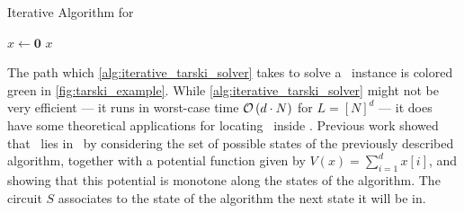 \begin{algorithm}
	\caption{Iterative Algorithm for \Tarski}
	\label{alg:iterative_tarski_solver}
	$x \leftarrow \mathbf{0}$ \;
	\Return $x$ \;
\end{algorithm}

The path which \cref{alg:iterative_tarski_solver} takes to solve a \Tarski\ instance is colored green in \cref{fig:tarski_example}. While \cref{alg:iterative_tarski_solver} might not be very efficient --- it runs in worst-case time $\mathcal{O}\left(d \cdot N\right)$ for $L = [N]^d$ --- it does have some theoretical applications for locating \Tarski\ inside \TFNP. Previous work  showed that \Tarski\ lies in \PLS\ by considering the set of possible states of the previously described algorithm, together with a potential function given by $V(x) = \sum_{i=1}^{d}{x[i]}$, and showing that this potential is monotone along the states of the algorithm. The circuit $S$ associates to the state of the algorithm the next state it will be in.

